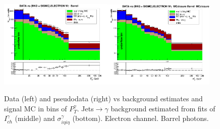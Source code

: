 \begin{figure}[htb]
\begin{center}
   \includegraphics[width=0.48\textwidth]{../figs/figs_v11/ELECTRON_WGamma/PrepareYields/c_DATAvsBkgPlusSigMCc_ELECTRON_WGamma_TEMPL_SIHIH_UNblind__Barrel__phoEt.png}\includegraphics[width=0.48\textwidth]{../figs/figs_v11/ELECTRON_WGamma/PrepareYields/c_DATAvsBkgPlusSigMCc_ELECTRON_WGamma_TEMPL_SIHIH_UNblind_MCclosure__Barrel__phoEt_MCclosure.png}
  \caption{Data (left) and pseudodata (right) vs background estimates and signal MC in bins of $P_T^{\gamma}$. Jets$\rightarrow\gamma$ background estimated from fits of $I_{ch}^{\gamma}$ (middle) and  $\sigma_{i\eta i\eta}^{\gamma}$ (bottom). Electron channel. Barrel photons.}
  \label{fig:DATAvsBKGandSIGMC_MCclosure_ELECTRON_B}
  \end{center}
\end{figure}

